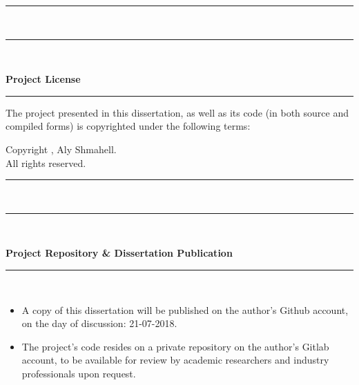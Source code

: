 \documentclass[a4paper, 12pt]{report}
\newenvironment{nscenter}
{\parskip=0.2cm\par\nopagebreak\centering}
{\parskip=0pt\par\noindent\ignorespacesafterend}
\begin{document}
\begin{titlepage}
\begin{nscenter}
	\end{nscenter}	
	\rule{\linewidth}{0.2mm} \\[0.5cm]
	\noindent
	\rule{\linewidth}{0.5mm} \\[0.2cm]
	\begin{minipage}{0.5\textwidth}
		\Large{\textbf{Project License}}
	\end{minipage}
	\begin{minipage}{0.5\textwidth}
		\begin{flushright}
			\Huge{\textcopyright}
		\end{flushright}
	\end{minipage}
	\rule{\linewidth}{0.2mm}
	\noindent
	\vspace{-0.45cm}
	\begin{nscenter}
		The project presented in this dissertation, as well as its code (in both source and compiled forms) is copyrighted under the following terms:
	\end{nscenter}
	\vspace{-0.5cm}
	\begin{tcbraster}[raster columns=2,raster rows=1,
		enhanced,size=small,fit algorithm=hybrid* ]
		\begin{nscenter}
			\begin{tcolorbox}[colback=white]
				\begin{center}
					Copyright \textcopyright {}, Aly Shmahell.\\
					All rights reserved.
				\end{center}
			\end{tcolorbox}
		\end{nscenter}
	\end{tcbraster}
	\rule{\linewidth}{0.2mm} \\[0.5cm]
	\noindent
	\rule{\linewidth}{0.5mm} \\[0.2cm]
	\begin{minipage}{\textwidth}
		\Large{\textbf{Project Repository \& Dissertation Publication}}
	\end{minipage}
	\rule{\linewidth}{0.2mm} \\[0.1cm]
	\noindent
	\vspace{-0.6cm}
		\begin{itemize}[nosep]
		\item A copy of this dissertation will be published on the author's Github account, on the day of discussion: 21-07-2018.
		\item The project's code resides on a private repository on the author's Gitlab account, to be available for review by academic researchers and industry professionals upon request.

\end{itemize}
\end{titlepage}
\end{document}
